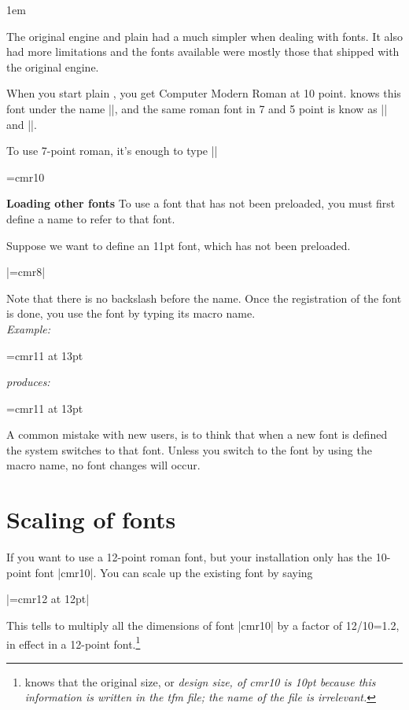 \begin{multicols}{2}
\parindent1em

The original \tex engine and plain had a much simpler when dealing with fonts. It also had more limitations and the fonts available were mostly those that shipped with the original \tex engine.

When you start plain \tex, you get Computer Modern Roman at 10 point. \tex knows this font under the name
|\tenrm|, and the same roman font in 7 and 5 point is know as |\sevenrm| and |\fiverm|.

To use 7-point roman, it's enough to type |\sevenrm|

\begingroup
  \sevenrm
   \frogking
\endgroup

\begingroup
  \font\tenrm=cmr10
    \tenrm
   \frogking
\endgroup

{\bf Loading other fonts} To use a font that has not been preloaded, you must first define a name to refer to that font.

Suppose we want to define an 11pt font, which has not been preloaded.

|\font\elevenrm=cmr8|

Note that there is no backslash before the name. Once the registration of the font is done, you use the font
by typing its macro name.\\
\textit{Example:}
\begin{teX}
\font\elevenrm=cmr11 at 13pt
\elevenrm
\frogking
\end{teX}
\textit{produces:}

\begingroup
\font\elevenrm=cmr11 at 13pt
\elevenrm
\frogking
\endgroup

A common mistake with new users, is to think that when a new font is defined the system switches to that font. Unless you switch to the font by using the macro name, no font changes will occur.

\section*{Scaling of fonts}

If you want to use a 12-point roman font, but your \tex installation only has the 10-point font |cmr10|. You can scale up the existing font by saying

|\font\twelverm=cmr12 at 12pt|

This tells \tex to multiply all the dimensions of font |cmr10| by a factor of 12/10=1.2, in effect in a 12-point font.\footnote{\tex knows that the original size, or \textit{design size, of cmr10 is 10pt because this information is written in the tfm file; the name of the file is irrelevant.}}


\end{multicols}
